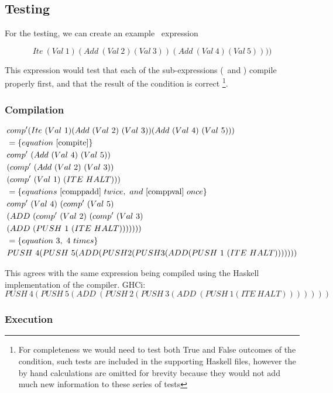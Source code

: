 \documentclass {article}
\begin{document}
\subsection{Testing}

For the testing, we can create an example \ite\ expression

	\[Ite \ (Val \ 1) (Add \ (Val \ 2) (Val \ 3)) (Add \ (Val \ 4) (Val \ 5)))) \]

This expression would test that
each of the sub-expressions 
(\add\ and \val) compile properly first, 
and that the result of the condition is correct
\footnote{
For completeness we would need to 
test both True and False outcomes of the condition,
such tests are included in the supporting Haskell files, 
however the by hand calculations are omitted
for brevity because they would not add much new
information to these series of tests}.

\subsubsection{Compilation}

\begin{align*}
	&comp' (Ite\ 
			(Val\ 1) 
			(Add\ (Val\ 2)\ (Val\ 3)) 
			(Add\ (Val\ 4)\ (Val\ 5))) \\
	&= \{ equation\ \ref{compite} \}\ \\ 
	&comp'\ (Add\ (Val\ 4)\ (Val\ 5))\\
		&(comp'\ (Add\ (Val\ 2)\ (Val\ 3))\\
			&(comp'\ (Val\ 1)\ (ITE\  HALT))) \\
	&= \{ equations\ \ref{comppadd}\ twice,\ and\ \ref{comppval}\ once\} \\
	&comp'\ (Val\ 4)\ 
		(comp'\ (Val\ 5)\ \\
				&(ADD\ (comp'\ (Val\ 2)\ 
						(comp'\ (Val\ 3)\ \\
							&(ADD\ (PUSH\ 1\ 
								(ITE\ HALT))))))) \\
	&= \{equation \ 3, \ 4 \ times \} \\
	&PUSH \ 4 (PUSH \ 5 (ADD (PUSH 2 (PUSH 3 (ADD (PUSH \ 1 \ (ITE \ HALT)))))))
\end{align*}

This agrees with the same expression being compiled
using the Haskell implementation of the compiler.
GHCi:
\[ PUSH\ 4(PUSH\ 5(ADD\ (PUSH\ 2(PUSH\ 3(ADD\ (PUSH\ 1(ITE\ HALT))))))) \]
	
\subsubsection{Execution}
\end{document}
